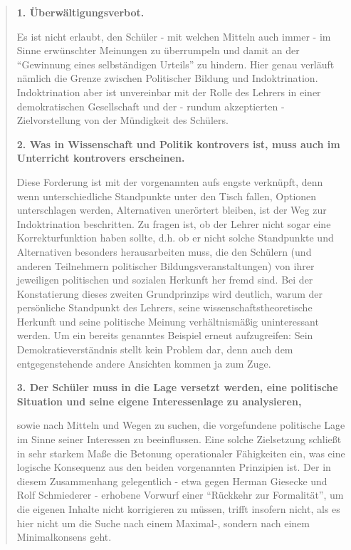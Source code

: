 \usepackage[]{minitoc}
\setcounter{secttocdepth}{4}
\setlength{\stcindent}{24pt}

\dosecttoc
\dosectlof
\dosectlot

\secttoc



\begin{quote}
    \textbf{1. Überwältigungsverbot.}

    Es ist nicht erlaubt, den Schüler - mit welchen Mitteln auch immer - im Sinne erwünschter Meinungen zu überrumpeln und damit an der \enquote{Gewinnung eines selbständigen Urteils} zu hindern. Hier genau verläuft nämlich die Grenze zwischen Politischer Bildung und Indoktrination. Indoktrination aber ist unvereinbar mit der Rolle des Lehrers in einer demokratischen Gesellschaft und der - rundum akzeptierten - Zielvorstellung von der Mündigkeit des Schülers. 

    \textbf{2. Was in Wissenschaft und Politik kontrovers ist, muss auch im Unterricht kontrovers erscheinen.}

    Diese Forderung ist mit der vorgenannten aufs engste verknüpft, denn wenn unterschiedliche Standpunkte unter den Tisch fallen, Optionen unterschlagen werden, Alternativen unerörtert bleiben, ist der Weg zur Indoktrination beschritten. Zu fragen ist, ob der Lehrer nicht sogar eine Korrekturfunktion haben sollte, d.h. ob er nicht solche Standpunkte und Alternativen besonders herausarbeiten muss, die den Schülern (und anderen Teilnehmern politischer Bildungsveranstaltungen) von ihrer jeweiligen politischen und sozialen Herkunft her fremd sind. Bei der Konstatierung dieses zweiten Grundprinzips wird deutlich, warum der persönliche Standpunkt des Lehrers, seine wissenschaftstheoretische Herkunft und seine politische Meinung verhältnismäßig uninteressant werden. Um ein bereits genanntes Beispiel erneut aufzugreifen: Sein Demokratieverständnis stellt kein Problem dar, denn auch dem entgegenstehende andere Ansichten kommen ja zum Zuge. 
    
    \textbf{3. Der Schüler muss in die Lage versetzt werden, eine politische Situation und seine eigene Interessenlage zu analysieren,} 

    sowie nach Mitteln und Wegen zu suchen, die vorgefundene politische Lage im Sinne seiner Interessen zu beeinflussen. Eine solche Zielsetzung schließt in sehr starkem Maße die Betonung operationaler Fähigkeiten ein, was eine logische Konsequenz aus den beiden vorgenannten Prinzipien ist. Der in diesem Zusammenhang gelegentlich - etwa gegen Herman Giesecke und Rolf Schmiederer - erhobene Vorwurf einer \enquote{Rückkehr zur Formalität}, um die eigenen Inhalte nicht korrigieren zu müssen, trifft insofern nicht, als es hier nicht um die Suche nach einem Maximal-, sondern nach einem Minimalkonsens geht. 
    
    \autocite[Im Original mit anderen Hervorhebungen:][179-180]{Wehling1977}
\end{quote}

